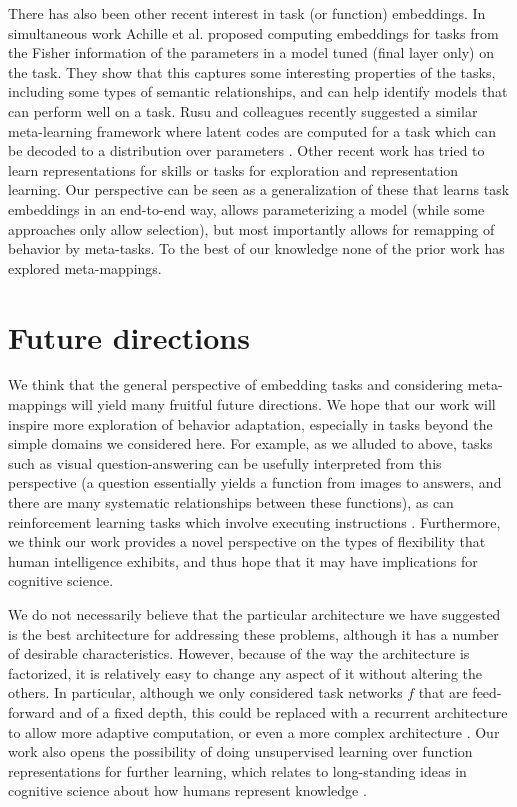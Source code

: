 \documentclass{article}
\begin{document}
There has also been other recent interest in task (or function) embeddings. In simultaneous work Achille et al. \citep{Achille2019} proposed computing embeddings for tasks from the Fisher information of the parameters in a model tuned (final layer only) on the task. They show that this captures some interesting properties of the tasks, including some types of semantic relationships, and can help identify models that can perform well on a task. Rusu and colleagues recently suggested a similar meta-learning framework where latent codes are computed for a task which can be decoded to a distribution over parameters \citep{Rusu2019}. Other recent work has tried to learn representations for skills \citep[e.g.][]{Eysenbach2019} or tasks \citep[e.g.]{Hsu2019} for exploration and representation learning. Our perspective can be seen as a generalization of these that learns task embeddings in an end-to-end way, allows parameterizing a model (while some approaches only allow selection), but most importantly allows for remapping of behavior by meta-tasks. To the best of our knowledge none of the prior work has explored meta-mappings. \par
\section{Future directions}
We think that the general perspective of embedding tasks and considering meta-mappings will yield many fruitful future directions. We hope that our work will inspire more exploration of behavior adaptation, especially in tasks beyond the simple domains we considered here. For example, as we alluded to above, tasks such as visual question-answering \citep[e.g.][]{Antol2015} can be usefully interpreted from this perspective (a question essentially yields a function from images to answers, and there are many systematic relationships between these functions), as can reinforcement learning tasks which involve executing instructions \citep[e.g.][]{Hermann2017, Co-Reyes2019}. Furthermore, we think our work provides a novel perspective on the types of flexibility that human intelligence exhibits, and thus hope that it may have implications for cognitive science. \par 
We do not necessarily believe that the particular architecture we have suggested is the best architecture for addressing these problems, although it has a number of desirable characteristics. However, because of the way the architecture is factorized, it is relatively easy to change any aspect of it without altering the others. In particular, although we only considered task networks $f$ that are feed-forward and of a fixed depth, this could be replaced with a recurrent architecture to allow more adaptive computation, or even a more complex architecture \citep[e.g.][]{Reed2015, Graves2016}. Our work also opens the possibility of doing unsupervised learning over function representations for further learning, which relates to long-standing ideas in cognitive science about how humans represent knowledge \citep{Clark1993}. \par 
\end{document}
